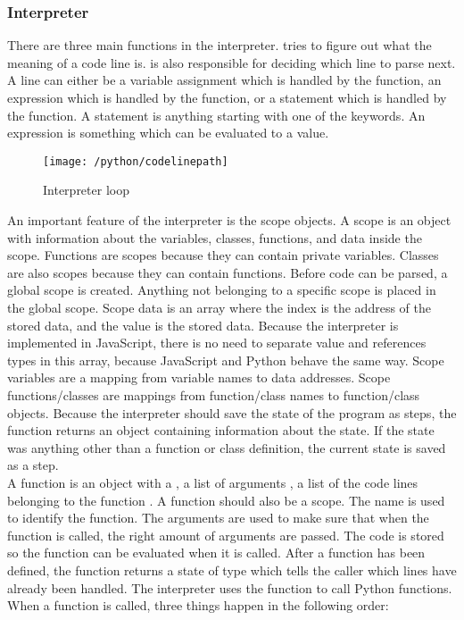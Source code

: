 \subsubsection{Interpreter}
There are three main functions in the interpreter.  tries to figure out what the meaning of a code line is.  is also responsible for deciding which line to parse next. A line can either be a variable assignment which is handled by the  function, an expression which is handled by the  function, or a statement which is handled by the  function. A statement is anything starting with one of the keywords. An expression is something which can be evaluated to a value.
\begin{figure}[H]
    \centering
    \texttt{[image: /python/codelinepath]}
    \caption{Interpreter loop}
    \label{fig:pythonCodeLinePath}
\end{figure}
An important feature of the interpreter is the scope objects. A scope is an object with information about the variables, classes, functions, and data inside the scope. Functions are scopes because they can contain private variables. Classes are also scopes because they can contain functions. Before code can be parsed, a global scope is created. Anything not belonging to a specific scope is placed in the global scope. Scope data is an array where the index is the address of the stored data, and the value is the stored data. Because the interpreter is implemented in JavaScript, there is no need to separate value and references types in this array, because JavaScript and Python behave the same way. Scope variables are a mapping from variable names to data addresses. Scope functions/classes are mappings from function/class names to function/class objects. Because the interpreter should save the state of the program as steps, the  function returns an object containing information about the state. If the state was anything other than a function or class definition, the current state is saved as a step.
\\[11pt]
A function is an object with a , a list of arguments , a list of the code lines belonging to the function . A function should also be a scope. The name is used to identify the function. The arguments are used to make sure that when the function is called, the right amount of arguments are passed. The code is stored so the function can be evaluated when it is called. After a function has been defined, the  function returns a state of type  which tells the caller which lines have already been handled. The interpreter uses the  function to call Python functions. When a function is called, three things happen in the following order:
